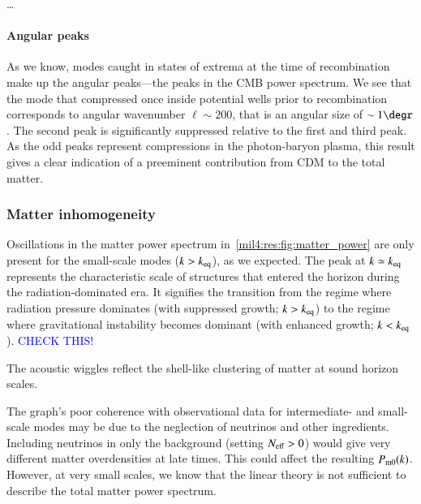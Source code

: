 \dots

\paragraph{Angular peaks}
As we know, modes caught in states of extrema at the time of recombination make up the angular peaks---the peaks in the CMB power spectrum. We see that the mode that compressed once inside potential wells prior to recombination corresponds to angular wavenumber $\ell\sim 200$, that is an angular size of $\sim 1\degr$. The second peak is significantly suppressed relative to the first and third peak. As the odd peaks represent compressions in the photon-baryon plasma, this result gives a clear indication of a preeminent contribution from CDM to the total matter.  




\subsubsection{Matter inhomogeneity}
Oscillations in the matter power spectrum in~\cref{mil4:res:fig:matter_power} are only present for the small-scale modes ($k>k_\mathrm{eq}$), as we expected. The peak at $k\simeq k_\mathrm{eq}$ represents the characteristic scale of structures that entered the horizon during the radiation-dominated era. It signifies the transition from the regime where radiation pressure dominates (with suppressed growth; $k>k_\mathrm{eq}$) to the regime where gravitational instability becomes dominant (with enhanced growth; $k<k_\mathrm{eq}$). \textcolor{blue}{CHECK THIS!} 

The acoustic wiggles reflect the shell-like clustering of matter at sound horizon scales. 

The graph's poor coherence with observational data for intermediate- and small-scale modes may be due to the neglection of neutrinos and other ingredients. Including neutrinos in only the background (setting $N_\mathrm{eff}> 0$) would give very different matter overdensities at late times. This could affect the resulting $P_\mathrm{m0}(k)$. However, at very small scales, we know that the linear theory is not sufficient to describe the total matter power spectrum.
